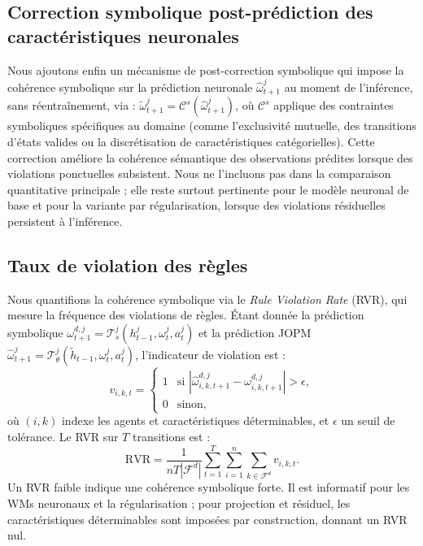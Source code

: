 \documentclass[final]{jfsma}
\theoremstyle{plain}
\theoremstyle{definition}
\theoremstyle{remark}
\begin{document}
\subsection{Correction symbolique post-prédiction des caractéristiques neuronales}
\label{sec:post_prediction_correction}

Nous ajoutons enfin un mécanisme de post-correction symbolique qui impose la cohérence symbolique
sur la prédiction neuronale $\hat{\omega}^j_{t+1}$ au moment de l'inférence, sans réentraînement, via :
%
$\tilde{\omega}^{j}_{t+1} = \mathcal{C}^{s}(\hat{\omega}^{j}_{t+1})$,
%
où $\mathcal{C}^{s}$ applique des contraintes symboliques spécifiques au domaine
(comme l'exclusivité mutuelle, des transitions d'états valides ou la discrétisation de caractéristiques catégorielles).
Cette correction améliore la cohérence sémantique des observations prédites lorsque des violations ponctuelles subsistent. Nous ne l'incluons pas dans la comparaison quantitative principale ; elle reste surtout pertinente pour le modèle neuronal de base et pour la variante par régularisation, lorsque des violations résiduelles persistent à l'inférence.

\subsection{Taux de violation des règles}
\label{sec:rvr}

Nous quantifions la cohérence symbolique via le \textit{Rule Violation Rate} (RVR), qui mesure la fréquence des violations de règles. Étant donnée la prédiction symbolique $\omega^{d,j}_{t+1} = \mathcal{T}^j_s(h^j_{t-1}, \omega^j_t, a^j_t)$ et la prédiction JOPM $\hat{\omega}^j_{t+1} = \mathcal{T}_{\theta}^j(\tilde{h}_{t-1}, \omega^j_t, a^j_t)$, l'indicateur de violation est :
\begin{equation*}
  v_{i,k,t} =
  \begin{cases}
    1 & \text{si } \left| \hat{\omega}^{d,j}_{i,k,t+1} - \omega^{d,j}_{i,k,t+1} \right| > \epsilon, \\
    0 & \text{sinon},
  \end{cases}
\end{equation*}
où $(i,k)$ indexe les agents et caractéristiques déterminables, et $\epsilon$ un seuil de tolérance. Le RVR sur $T$ transitions est :
\begin{equation}
  \label{eq:rvr}
  \text{RVR} = \frac{1}{n T |\mathcal{F}^d|} \sum_{t=1}^T \sum_{i=1}^n \sum_{k \in \mathcal{F}^d} v_{i,k,t}.
\end{equation}
Un RVR faible indique une cohérence symbolique forte. Il est informatif pour les WMs neuronaux et la régularisation ; pour projection et résiduel, les caractéristiques déterminables sont imposées par construction, donnant un RVR nul.
\end{document}
